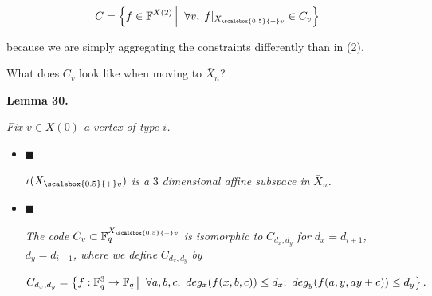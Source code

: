 \documentclass[10pt,a4paper]{article}
\begin{document}
\[\begin{gathered}
C=\left\{f\in\mathbb{F}^{X(2)}\left|\;\vphantom{f\in\mathbb{F}^{X(2)}\forall v,\;f|_{{X}_{\scalebox{0.5}{+}v}}\in C_{v}}\right.\forall v,\;f|_{{X}_{\scalebox{0.5}{+}v}}\in C_{v}\right\}
\end{gathered}\]


because we are simply aggregating the constraints differently than in (2).\par




What does $C_{v}$ look like when moving to $\bar{X}_{n}$?\par





\par\medskip\noindent\textbf{
\textbf{Lemma 30}\textbf{.}
}\par



\emph{Fix $v\in X(0)$ a vertex of type $i$.}\par


\begin{itemize}


\item[] 
$\blacksquare$ 


$\iota({X}_{\scalebox{0.5}{+}v})$\emph{ is a }$3$\emph{ dimensional affine subspace in }$\bar{X}_{n}$\emph{.}\par





\item[] 
$\blacksquare$ 


\emph{The code }$C_{v}\subset\mathbb{F}_{q}^{{X}_{\scalebox{0.5}{+}v}}$\emph{ is isomorphic to }$C_{d_{x},d_{y}}$\emph{ for }$d_{x}=d_{i+1}$\emph{, }$d_{y}=d_{i-1}$\emph{, where
we define }$C_{d_{x},d_{y}}$\emph{ by}\par


\[\begin{gathered}
C_{d_{x},d_{y}}=\left\{f:\mathbb{F}_{q}^{3}\to\mathbb{F}_{q}\left|\;\vphantom{f:\mathbb{F}_{q}^{3}\to\mathbb{F}_{q}\forall a,b,c,\,\,deg_{x}(f(x,b,c))\leq d_{x};\,\,deg_{y}(f(a,y,ay+c))\leq d_{y}}\right.\forall a,b,c,\,\,deg_{x}(f(x,b,c))\leq d_{x};\,\,deg_{y}(f(a,y,ay+c))\leq d_{y}\right\}.
\end{gathered}\]





\end{itemize}
\end{document}
